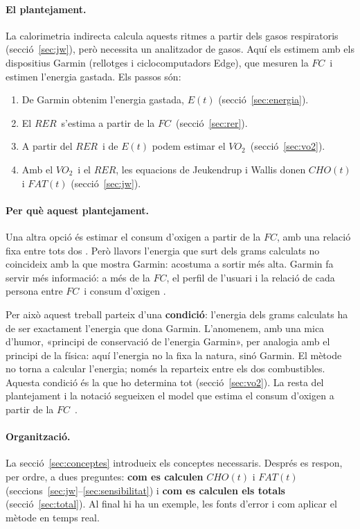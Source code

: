 \documentclass[10pt,a4paper]{article}
\newcommand{\cho}{\ensuremath{\mathit{CHO}}}               %
\newcommand{\fat}{\ensuremath{\mathit{FAT}}}
\newcommand{\VO}{\ensuremath{\mathit{VO}_2}}               %
\newcommand{\RER}{\ensuremath{\mathit{RER}}}
\newcommand{\FC}{\ensuremath{\mathit{FC}}}
\begin{document}
\paragraph{El plantejament.} La calorimetria indirecta calcula aquests ritmes a partir dels
gasos respiratoris (secció~\ref{sec:jw}), però necessita un analitzador de gasos. Aquí els
estimem amb els dispositius Garmin (rellotges i ciclocomputadors Edge), que mesuren la \FC\
i estimen l'energia gastada. Els passos són:
\begin{enumerate}[leftmargin=*,itemsep=0pt]
  \item De Garmin obtenim l'energia gastada, $E(t)$ (secció~\ref{sec:energia}).
  \item El \RER\ s'estima a partir de la \FC\ (secció~\ref{sec:rer}).
  \item A partir del \RER\ i de $E(t)$ podem estimar el \VO\ (secció~\ref{sec:vo2}).
  \item Amb el \VO\ i el \RER, les equacions de Jeukendrup i Wallis donen $\cho(t)$ i
        $\fat(t)$ (secció~\ref{sec:jw}).
\end{enumerate}

\paragraph{Per què aquest plantejament.} Una altra opció és estimar el consum d'oxigen a partir de la \FC, amb una relació fixa entre tots
dos \citep{swain1997,chofatfc2026}. Però llavors l'energia que surt dels grams calculats no
coincideix amb la que mostra Garmin: acostuma a sortir més alta. Garmin fa servir més
informació: a més de la \FC, el perfil de l'usuari i la relació de cada persona entre \FC\ i
consum d'oxigen \citep{firstbeat2007}.

Per això aquest treball parteix d'una \textbf{condició}: l'energia dels grams calculats ha
de ser exactament l'energia que dona Garmin. L'anomenem, amb una mica d'humor,
«principi de conservació de l'energia Garmin», per analogia amb el principi de la física:
aquí l'energia no la fixa la natura, sinó Garmin. El mètode no torna a calcular l'energia;
només la reparteix entre els dos combustibles. Aquesta condició és la que ho determina tot
(secció~\ref{sec:vo2}). La resta del plantejament i la notació segueixen el model que
estima el consum d'oxigen a partir de la \FC\ \citep{chofatfc2026}.

\paragraph{Organització.} La secció~\ref{sec:conceptes} introdueix els conceptes necessaris. Després es respon, per
ordre, a dues preguntes: \textbf{com es calculen} $\cho(t)$ i $\fat(t)$
(seccions~\ref{sec:jw}--\ref{sec:sensibilitat}) i \textbf{com es calculen els totals}
(secció~\ref{sec:total}). Al final hi ha un exemple, les fonts d'error i com
aplicar el mètode en temps real.
\end{document}
